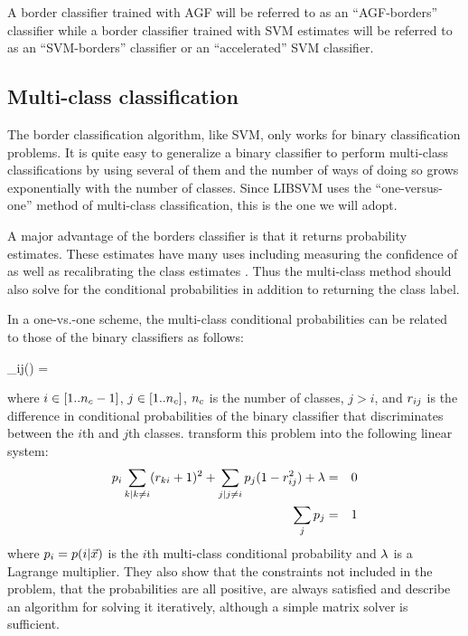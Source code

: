 A border classifier trained with AGF will be referred to as an ``AGF-borders''
classifier while a border classifier trained with SVM estimates will
be referred to as an ``SVM-borders'' classifier or an ``accelerated'' SVM classifier.

\subsection{Multi-class classification}

The border classification algorithm, like SVM, only works for binary 
classification problems. It is quite easy to generalize a binary classifier
to perform multi-class classifications by using several of them and the
number of ways of doing so grows exponentially with the number of classes.
Since LIBSVM uses the ``one-versus-one'' method \citep{Hsu_Lin2002} of 
multi-class classification, this is the one we will adopt. 

A major advantage of the
borders classifier is that it returns probability estimates.
These estimates have many uses including measuring the confidence of as well
as recalibrating the class estimates \citep{Mills2009,Mills2011}.
Thus the multi-class method
should also solve for the conditional probabilities in addition to returning
the class label.

In a one-vs.-one scheme, the multi-class conditional probabilities 
can be related to those of the binary classifiers as follows:
\begin{eqnnon}
	\diffcondprob_{ij}(\point) = 
	\label{bin2multi}
\end{eqnnon}
where $i \in [1..n_c-1]$, $j \in [1..n_c]$, $n_c$ is the number of classes, $j>i$,
and $r_{ij}$ is the difference in conditional probabilities of
the binary classifier that discriminates between the $i$th and $j$th classes.
\citet{Wu_etal2004} transform this problem into the following linear system:
\begin{eqnarray}
	p_i \sum_{k|k \ne i} (r_{ki} + 1)^2 +
	\sum_{j|j \ne i} p_j (1 - r_{ij}^2) + \lambda & = & 0 \\ \nonumber
	\sum_j p_j & = & 1
	\label{multiclass}
\end{eqnarray}
where $p_i = p(i | \vec {x})$ is the $i$th multi-class 
conditional probability and $\lambda$ is a Lagrange multiplier.
They also show that the constraints not included in the problem, that
the probabilities are all positive, are always satisfied
and describe an algorithm for solving it iteratively, although a
simple matrix solver is sufficient.

